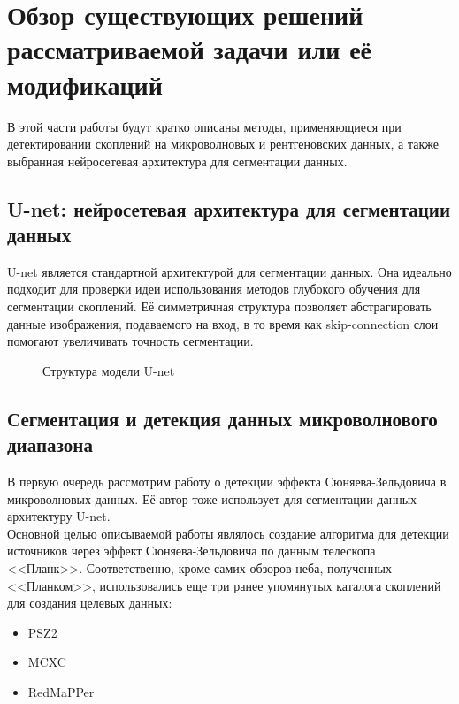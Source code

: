 \chapter{Обзор существующих решений рассматриваемой задачи или её модификаций}
\label{cha:ch_2}

В этой части работы будут кратко описаны методы, применяющиеся при детектировании скоплений на 
микроволновых и рентгеновских данных, а также выбранная нейросетевая архитектура для сегментации 
данных.\\



\section{U-net: нейросетевая архитектура для сегментации данных}
U-net \cite{Unet} является стандартной архитектурой для сегментации данных. Она идеально подходит 
для проверки идеи использования методов глубокого обучения для сегментации скоплений.
Её симметричная структура позволяет абстрагировать данные изображения, подаваемого на 
вход, в то время как skip-connection слои помогают увеличивать точность сегментации.

\begin{figure}[h]
    \caption{Структура модели U-net \cite{Unet}}
\end{figure}

\section{Сегментация и детекция данных микроволнового диапазона}

В первую очередь рассмотрим работу о детекции эффекта Сюняева-Зельдовича \cite{Bonjean} в 
микроволновых данных. Её автор тоже использует для сегментации данных архитектуру U-net. \\

Основной целью описываемой работы являлось создание алгоритма для детекции источников через эффект 
Сюняева-Зельдовича по данным телескопа <<Планк>>. Соответственно, кроме самих обзоров неба, полученных 
<<Планком>>, использовались еще три ранее упомянутых каталога скоплений для создания целевых данных:

\begin{itemize}
	\item PSZ2 
	\item MCXC 
	\item RedMaPPer 
\end{itemize}

